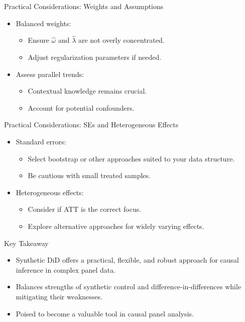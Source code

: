 \documentclass{beamer}
\begin{document}
\begin{frame}{Practical Considerations: Weights and Assumptions}

\begin{itemize}
    \item Balanced weights:
    \begin{itemize}
        \item Ensure $\hat{\omega}$ and $\hat{\lambda}$ are not overly concentrated.
        \item Adjust regularization parameters if needed.
    \end{itemize}
    \item Assess parallel trends:
    \begin{itemize}
        \item Contextual knowledge remains crucial.
        \item Account for potential confounders.
    \end{itemize}
\end{itemize}

\end{frame}


\begin{frame}{Practical Considerations: SEs and Heterogeneous Effects}

\begin{itemize}
    \item Standard errors:
    \begin{itemize}
        \item Select bootstrap or other approaches suited to your data structure.
        \item Be cautious with small treated samples.
    \end{itemize}
    \item Heterogeneous effects:
    \begin{itemize}
        \item Consider if ATT is the correct focus.
        \item Explore alternative approaches for widely varying effects.
    \end{itemize}
\end{itemize}

\end{frame}







\begin{frame}{Key Takeaway}

\begin{itemize}
    \item Synthetic DiD offers a practical, flexible, and robust approach for causal inference in complex panel data.
    \item Balances strengths of synthetic control and difference-in-differences while mitigating their weaknesses.
    \item Poised to become a valuable tool in causal panel analysis.
\end{itemize}

\end{frame}
\end{document}
